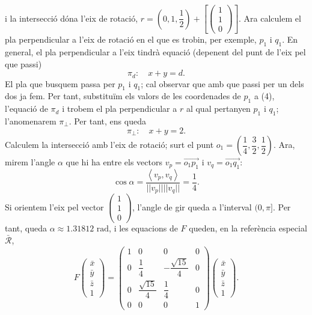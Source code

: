\documentclass[10pt]{article}
\newcommand{\norm}[1]{||#1||}
\newcommand{\scal}[2]{\left<#1,#2\right>}
\begin{document}
\begin{itemize}
\[\]
i la intersecció dóna l'eix de rotació, $r=\left(0,1,\dfrac{1}{2}\right)+\left[\begin{pmatrix}
1\\ 1\\ 0
\end{pmatrix}\right]$.
Ara calculem el pla perpendicular a l'eix de rotació en el que es trobin, per exemple, $p_1$ i $q_1$. En general, el pla perpendicular a l'eix tindrà equació (depenent del punt de l'eix pel que passi)
\begin{equation}
\pi_d:\quad x+y=d.
\end{equation}
El pla que busquem passa per $p_1$ i $q_1$; cal observar que amb que passi per un dels dos ja fem. Per tant, substituïm els valors de les coordenades de $p_1$ a (4), l'equació de $\pi_d$ i trobem el pla perpendicular a $r$ al qual pertanyen $p_1$ i $q_1$; l'anomenarem $\pi_{\perp}$. Per tant, ens queda
\begin{equation}
\pi_{\perp}:\quad x+y=2.
\end{equation}
Calculem la intersecció amb l'eix de rotació; surt el punt $o_1=\left(\dfrac{1}{4},\dfrac{3}{2},\dfrac{1}{2}\right)$. Ara, mirem l'angle $\alpha$ que hi ha entre els vectors $v_p=\vec{o_1p_1}$ i $v_q=\vec{o_1q_1}$:
\[
\cos{\alpha}=\dfrac{\scal{v_p}{v_q}}{\norm{v_p}\norm{v_q}}=\dfrac{1}{4}.
\]
Si orientem l'eix pel vector $\begin{pmatrix}
1\\ 1\\ 0
\end{pmatrix}$, l'angle de gir queda a l'interval $(0,\pi]$. Per tant, queda $\alpha\approx 1.31812\text{ rad}$, i les equacions de $F$ queden, en la referència especial $\bar{\mathcal{R}}$,
\[
F\begin{pmatrix}
\bar{x}\\
\bar{y}\\
\bar{z}\\
1
\end{pmatrix}=\begin{pmatrix}
1 & 0 & 0 & 0\\
0 & \dfrac{1}{4} & -\dfrac{\sqrt{15}}{4} & 0\\
0 & \dfrac{\sqrt{15}}{4} & \dfrac{1}{4} & 0\\
0 & 0 & 0 & 1
\end{pmatrix}\begin{pmatrix}
\bar{x}\\
\bar{y}\\
\bar{z}\\
1
\end{pmatrix}.
\]
\end{itemize}
\end{document}

